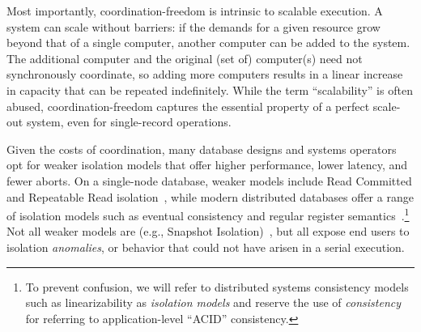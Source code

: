 

 Most importantly,
coordination-freedom is intrinsic to scalable execution. A \cfree
system can scale without barriers: if the demands for a given resource
grow beyond that of a single computer, another computer can be added
to the system. The additional computer and the original (set of)
computer(s) need not synchronously coordinate, so adding more
computers results in a linear increase in capacity that can be
repeated indefinitely. While the term ``scalability'' is often abused,
coordination-freedom captures the essential property of a perfect
scale-out system, even for single-record operations.


 Given the costs of coordination, many
database designs and systems operators opt for weaker isolation models
that offer higher performance, lower latency, and fewer aborts. On a
single-node database, weaker models include Read Committed and
Repeatable Read isolation~\cite{adya-isolation}, while modern
distributed databases offer a range of isolation models such as
eventual consistency and regular register
semantics~\cite{hat-vldb}.\footnote{To prevent confusion, we will
  refer to distributed systems consistency models such as
  linearizability as \textit{isolation models} and reserve the use of
  \textit{consistency} for referring to application-level ``ACID''
  consistency.}  Not all weaker models are \cfree (e.g., Snapshot
Isolation)~\cite{hat-vldb}, but all expose end users to isolation
\textit{anomalies}, or behavior that could not have arisen in a serial
execution.


